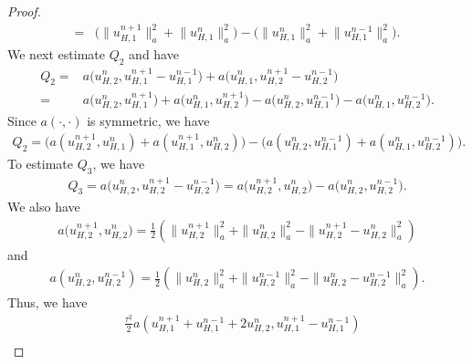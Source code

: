 \documentclass[preprint,12pt]{elsarticle}
\begin{document}
\begin{proof}
\begin{equation}
\begin{aligned}
      =&\Big(\big\|u_{H,1}^{n+1}\big\|_a^2+\big\|u_{H,1}^{n}\big\|_a^2\Big)-\Big(\big\|u_{H,1}^{n}\big\|_a^2+\big\|u_{H,1}^{n-1}\big\|_a^2\Big).
\end{aligned}
\end{equation}
We next estimate $Q_2$ and have
\begin{equation}\label{1.121}
\begin{aligned}
      Q_2=&a\big(u_{H,2}^{n},u_{H,1}^{n+1}-u_{H,1}^{n-1}\big)+a\big(u_{H,1}^{n},u_{H,2}^{n+1}-u_{H,2}^{n-1}\big)\\
      =&a\big(u_{H,2}^{n},u_{H,1}^{n+1}\big)+a\big(u_{H,1}^{n},u_{H,2}^{n+1}\big)-a\big(u_{H,2}^{n},u_{H,1}^{n-1}\big)-a\big(u_{H,1}^{n},u_{H,2}^{n-1}\big).
\end{aligned}
\end{equation}
Since $a(\cdot,\cdot)$ is symmetric, we have
\begin{equation}\label{1.122}
\begin{aligned}      Q_2=\big(a(u_{H,2}^{n+1},u_{H,1}^{n})+a(u_{H,1}^{n+1},u_{H,2}^{n})\big)-\big(a(u_{H,2}^{n},u_{H,1}^{n-1})+a(u_{H,1}^{n},u_{H,2}^{n-1})\big).
\end{aligned}
\end{equation}
To estimate $Q_3$, we have 
\begin{equation}\label{1.123}
\begin{aligned}
      Q_3=a\big(u_{H,2}^{n},u_{H,2}^{n+1}-u_{H,2}^{n-1}\big)=a\big(u_{H,2}^{n+1},u_{H,2}^{n}\big)-a\big(u_{H,2}^{n},u_{H,2}^{n-1}\big).
\end{aligned}
\end{equation}
We also have 
\begin{equation}\label{1.124}
\begin{aligned}
      a\big(u_{H,2}^{n+1},u_{H,2}^{n}\big)=\frac{1}{2}\left(\|u_{H,2}^{n+1}\|_a^2+\|u_{H,2}^{n}\|_a^2-\|u_{H,2}^{n+1}-u_{H,2}^{n}\|_a^2\right)
\end{aligned}
\end{equation}
and
\begin{equation}\label{1.125}
\begin{aligned}
      a(u_{H,2}^{n},u_{H,2}^{n-1})=\frac{1}{2}\left(\|u_{H,2}^{n}\|_a^2+\|u_{H,2}^{n-1}\|_a^2-\|u_{H,2}^{n}-u_{H,2}^{n-1}\|_a^2\right).
\end{aligned}
\end{equation}
Thus, we have 
\begin{equation}\label{1.126}
\begin{aligned}
&\frac{\tau^2}{2} a\left(u_{H,1}^{n+1}+u_{H,1}^{n-1}+2u_{H,2}^{n},u_{H,1}^{n+1}-u_{H,1}^{n-1}\right) \\

\end{aligned}
\end{equation}
\end{proof}
\end{document}
